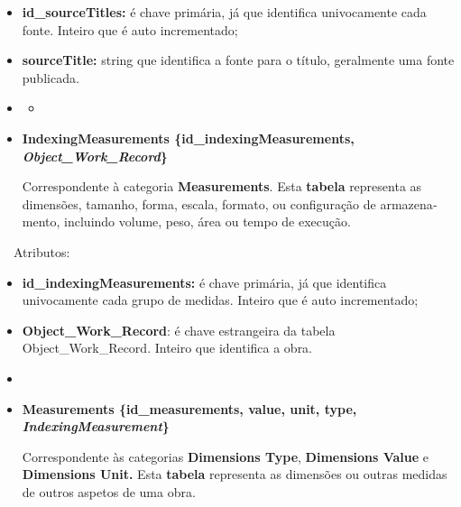 \documentclass[letterpaper]{article}
\newcommand\textstyleStrongEmphasis[1]{\textbf{#1}}
\newcommand\liststyleLi{%
\renewcommand\labelitemi{{\textbullet}}
\renewcommand\labelitemii{[27A2?]}
\renewcommand\labelitemiii{{\textbullet}}
\renewcommand\labelitemiv{{\textbullet}}
}
\newcommand\liststyleLiii{%
\renewcommand\labelitemi{[27A2?]}
\renewcommand\labelitemii{[27A2?]}
\renewcommand\labelitemiii{[27A2?]}
\renewcommand\labelitemiv{[27A2?]}
}
\newcommand\liststyleLiv{%
\renewcommand\labelitemi{[27A2?]}
\renewcommand\labelitemii{[27A2?]}
\renewcommand\labelitemiii{[27A2?]}
\renewcommand\labelitemiv{[27A2?]}
}
\begin{document}
\liststyleLiii
\begin{itemize}
\item {
\textbf{i}\textbf{d\_sourceTitles}\textbf{:} \'e chave prim\'aria, j\'a
que identifica univocamente cada fonte. Inteiro que \'e auto
incrementado;}
\item {
\textbf{sourceTitle:} string que identifica a fonte para o t\'itulo,
geralmente uma fonte publicada.}
\end{itemize}
\liststyleLi
\begin{itemize}
\item \begin{itemize}
\item[] 
\bigskip
\end{itemize}
\item {\bfseries
IndexingMeasurements\textmd{
\{}\textmd{id\_indexingMeasurements}\textmd{,
}\textmd{\textit{Object\_Work\_Record}}\textmd{\}}}

\foreignlanguage{english}{Correspondente \`a categoria
}\foreignlanguage{english}{\textbf{Measurements}}\foreignlanguage{english}{.
Esta
}\textstyleStrongEmphasis{\foreignlanguage{english}{\textmd{tabela}}}\foreignlanguage{english}{
representa as dimens\~oes, tamanho, forma, escala, formato, ou
configura\c{c}\~ao de armazenamento, incluindo volume, peso, \'area ou
tempo de execu\c{c}\~ao.}
\end{itemize}

\bigskip

{
\ \ Atributos:}

\liststyleLiv
\begin{itemize}
\item {
\textbf{id\_indexingMeasurements: }\'e chave prim\'aria, j\'a que
identifica univocamente cada grupo de medidas. Inteiro que \'e auto
incrementado;}
\item {
\textbf{Object\_Work\_Record}: \'e chave estrangeira da tabela
Object\_Work\_Record. Inteiro que identifica a obra.}
\end{itemize}
\liststyleLi
\begin{itemize}
\item[] 
\bigskip
\item {\bfseries
Measurements\textmd{ \{}\textmd{id\_measurements}\textmd{, value, unit,
type, }\textmd{\textit{IndexingMeasurement}}\textmd{\}}}

\foreignlanguage{english}{Correspondente \`as categorias
}\foreignlanguage{english}{\textbf{Dimensions
Type}}\foreignlanguage{english}{,
}\foreignlanguage{english}{\textbf{Dimensions
Value}}\foreignlanguage{english}{ e}\foreignlanguage{english}{
}\foreignlanguage{english}{\textbf{Dimensions
Unit}}\foreignlanguage{english}{\textbf{.
}}\foreignlanguage{english}{Esta
}\textstyleStrongEmphasis{\foreignlanguage{english}{\textmd{tabela}}}\foreignlanguage{english}{
representa as dimens\~oes ou outras medidas de outros aspetos de uma
obra.}
\end{itemize}
\end{document}
